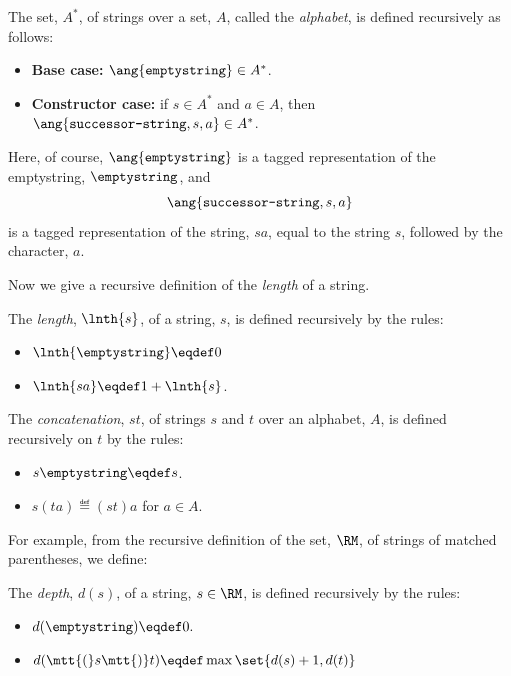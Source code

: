 \begin{definition}
\begin{definition}\label{A*}
The set, $A^*$, of strings over a set, $A$, called the \emph{alphabet},
is defined recursively as follows:
\begin{itemize}
\item \textbf{Base case:} $\ang{\texttt{emptystring}} \in A^*$.

\item \textbf{Constructor case:} if $s \in A^*$ and $a \in A$, then
$\ang{\texttt{successor-string},s,a}\in A^*$.

\end{itemize}
\end{definition}
Here, of course, $\ang{\texttt{emptystring}}$ is a tagged representation
of the emptystring, $\emptystring$, and
\[
\ang{\texttt{successor-string}, s, a}
\]
is a tagged representation of the string, $sa$, equal to the string $s$,
followed by the character, $a$.

Now we give a recursive definition of the \emph{length} of a string.
\begin{definition}
The \emph{length}, $\lnth{s}$, of a string, $s$, is defined recursively by
the rules:
\begin{itemize}
\item $\lnth{\emptystring} \eqdef 0$
\item $\lnth{sa} \eqdef 1+\lnth{s}$.
\end{itemize}
\end{definition}

\begin{definition}
The \emph{concatenation}, $st$, of strings $s$ and $t$ over an alphabet,
$A$, is defined recursively on $t$ by the rules:
\begin{itemize}
\item $s\emptystring \eqdef s$.
\item $s(ta) \eqdef (st)a$ for $a \in A$.
\end{itemize}
\end{definition}
\fi

For example, from the recursive definition of the set, $\RM$, of strings of
matched parentheses, we define:
\begin{definition}
The \emph{depth}, $d(s)$, of a string, $s \in\RM$, is defined
recursively by the rules:
\begin{itemize}
\item $d(\emptystring) \eqdef 0.$
\item $d(\mtt{(}s\mtt{)}t)
    \eqdef \max \set{d(s) + 1, d(t)}$
\end{itemize}
\end{definition}


\end{definition}
